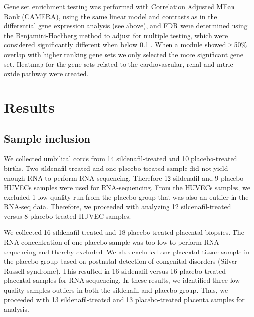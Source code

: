 \documentclass[authordate, empirical]{jote-new-article}
\begin{document}
	Gene set enrichment testing was performed with Correlation Adjusted MEan Rank (CAMERA), using the same linear model and contrasts as in the differential gene expression analysis (see above), and FDR were determined using the Benjamini-Hochberg method to adjust for multiple testing, which were considered significantly different when below 0.1 \parencites{Benjamini1995}. When a module showed ≥ 50\% overlap with higher ranking gene sets we only selected the more significant gene set. Heatmap for the gene sets related to the cardiovascular, renal and nitric oxide pathway were created.







	\section{Results}







	\subsection{Sample inclusion}



	We collected umbilical cords from 14 sildenafil-treated and 10 placebo-treated births. Two sildenafil-treated and one placebo-treated sample did not yield enough RNA to perform RNA-sequencing. Therefore 12 sildenafil and 9 placebo HUVECs samples were used for RNA-sequencing. From the HUVECs samples, we excluded 1 low-quality run from the placebo group that was also an outlier in the RNA-seq data. Therefore, we proceeded with analyzing 12 sildenafil-treated versus 8 placebo-treated HUVEC samples.



	We collected 16 sildenafil-treated and 18 placebo-treated placental biopsies. The RNA concentration of one placebo sample was too low to perform RNA-sequencing and thereby excluded. We also excluded one placental tissue sample in the placebo group based on postnatal detection of congenital disorders (Silver Russell syndrome). This resulted in 16 sildenafil versus 16 placebo-treated placental samples for RNA-sequencing. In these results, we identified three low-quality samples outliers in both the sildenafil and placebo group. Thus, we proceeded with 13 sildenafil-treated and 13 placebo-treated placenta samples for analysis.
\end{document}
